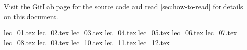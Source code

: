 \documentclass[10pt,english,a4paper, fancyfoot, git]{mkessler-script}
\author{Maximilian Keßler}
\begin{document}
\maketitle
\vfill
\doclicenseThis
Visit the
\href{https://gitlab.com/latexci/lecture-notes-bonn/topology-2}{GitLab page}
for the source code and read
\autoref{sec:how-to-read}
for details on this document.

\cleardoublepage
\tableofcontents

\cleardoublepage
\listoflecture

\cleardoublepage

    {lec_01.tex}
    {lec_02.tex}
    {lec_03.tex}
    {lec_04.tex}
    {lec_05.tex}
    {lec_06.tex}
    {lec_07.tex}
    {lec_08.tex}
    {lec_09.tex}
    {lec_10.tex}
    {lec_11.tex}
    {lec_12.tex}

\appendix

\cleardoublepage


\cleardoublepage


\cleardoublepage


\cleardoublepage


\cleardoublepage
\printbibliography

\printvocabindex
\end{document}
